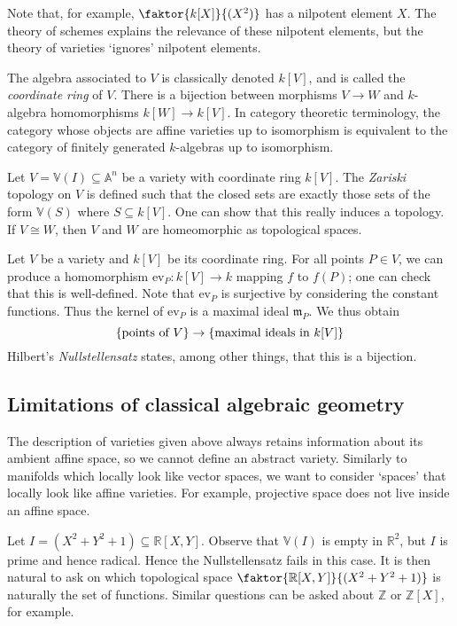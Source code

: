 Note that, for example, \( \faktor{k[X]}{(X^2)} \) has a nilpotent element \( X \).
The theory of schemes explains the relevance of these nilpotent elements, but the theory of varieties `ignores' nilpotent elements.

The algebra associated to \( V \) is classically denoted \( k[V] \), and is called the \emph{coordinate ring} of \( V \).
There is a bijection between morphisms \( V \to W \) and \( k \)-algebra homomorphisms \( k[W] \to k[V] \).
In category theoretic terminology, the category whose objects are affine varieties up to isomorphism is equivalent to the category of finitely generated \( k \)-algebras up to isomorphism.

Let \( V = \mathbb V(I) \subseteq \mathbb A^n \) be a variety with coordinate ring \( k[V] \).
The \emph{Zariski} topology on \( V \) is defined such that the closed sets are exactly those sets of the form \( \mathbb V(S) \) where \( S \subseteq k[V] \).
One can show that this really induces a topology.
If \( V \cong W \), then \( V \) and \( W \) are homeomorphic as topological spaces.

Let \( V \) be a variety and \( k[V] \) be its coordinate ring.
For all points \( P \in V \), we can produce a homomorphism \( \mathrm{ev}_P : k[V] \to k \) mapping \( f \) to \( f(P) \); one can check that this is well-defined.
Note that \( \mathrm{ev}_P \) is surjective by considering the constant functions.
Thus the kernel of \( \mathrm{ev}_P \) is a maximal ideal \( \mathfrak m_P \).
We thus obtain
\[ \qty{\text{points of } V} \to \qty{\text{maximal ideals in } k[V]} \]
Hilbert's \emph{Nullstellensatz} states, among other things, that this is a bijection.

\subsection{Limitations of classical algebraic geometry}
The description of varieties given above always retains information about its ambient affine space, so we cannot define an abstract variety.
Similarly to manifolds which locally look like vector spaces, we want to consider `spaces' that locally look like affine varieties.
For example, projective space does not live inside an affine space.

Let \( I = (X^2 + Y^2 + 1) \subseteq \mathbb R[X, Y] \).
Observe that \( \mathbb V(I) \) is empty in \( \mathbb R^2 \), but \( I \) is prime and hence radical.
Hence the Nullstellensatz fails in this case.
It is then natural to ask on which topological space \( \faktor{\mathbb R[X, Y]}{(X^2 + Y^2 + 1)} \) is naturally the set of functions.
Similar questions can be asked about \( \mathbb Z \) or \( \mathbb Z[X] \), for example.

